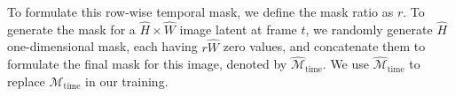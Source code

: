 To formulate this row-wise temporal mask, we define the mask ratio as $r$.
To generate the mask for a $\hat H \times \hat W$ image latent at frame $t$, we randomly generate $\hat H$ one-dimensional mask, each having $r\hat W$ zero values, and concatenate them to formulate the final mask for this image, denoted by $\widehat{\mathcal{M}}_{\text{time}}$. We use $\widehat{\mathcal{M}}_{\text{time}}$ to replace $\mathcal{M}_{\text{time}}$ in our training.




